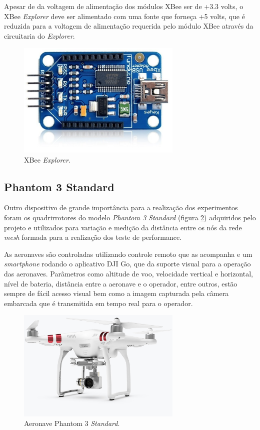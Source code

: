 Apesar de da voltagem de alimentação dos módulos XBee ser de +3.3 volts, o XBee \emph{Explorer} deve ser alimentado com uma fonte que forneça +5 volts, que é reduzida para a voltagem de alimentação requerida pelo módulo XBee através da circuitaria do \emph{Explorer}.

\begin{figure}[h!] 
\center
\includegraphics[width=0.7\textwidth]{xbeeexplorer.png}
\caption{XBee \emph{Explorer}.} 
\label{fig:xbeeexplorer}
\end{figure} 

\subsection{Phantom 3 Standard}

Outro dispositivo de grande importância para a realização dos experimentos foram os quadrirrotores do modelo \emph{Phantom 3 Standard} (figura \ref{fig:phantom}) adquiridos pelo projeto e utilizados para variação e medição da distância entre os nós da rede \emph{mesh} formada para a realização dos teste de performance.

As aeronaves são controladas utilizando controle remoto que as acompanha e um \emph{smartphone} rodando o aplicativo DJI Go, que da suporte visual para a operação das aeronaves. Parâmetros como altitude de voo, velocidade vertical e horizontal, nível de bateria, distância entre a aeronave e o operador, entre outros, estão sempre de fácil acesso visual bem como a imagem capturada pela câmera embarcada que é transmitida em tempo real para o operador. 

\begin{figure}[h!] 
\center
\includegraphics[width=0.7\textwidth]{phatom.jpg}
\caption{Aeronave Phantom 3 \emph{Standard}.} 
\label{fig:phantom}
\end{figure}

